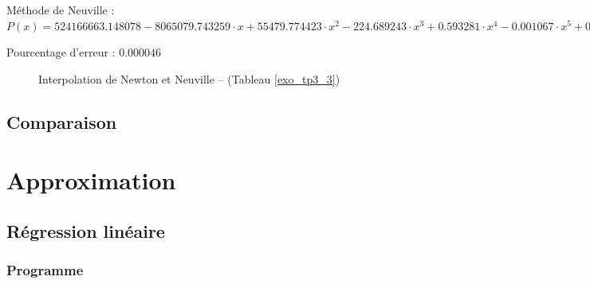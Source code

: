 \documentclass{report}
\begin{document}
      Méthode de Neuville : $P(x)= 524166663.148078-8065079.743259 \cdot x + 55479.774423 \cdot x^{2} - 224.689243 \cdot x^{3}  + 0.593281 \cdot x^{4} - 0.001067 \cdot x^{5}  + 0.000001 \cdot x^{6} - 0.000000 \cdot x^{7}  + 0.000000 \cdot x^{8} - 0.000000 \cdot x^{9}  + 0.000000 \cdot x^{10} $
      
      Pourcentage d'erreur : $0.000046$
      \begin{figure}[h]
	\centering
	\caption{Interpolation de Newton et Neuville -- (Tableau \ref{exo_tp3_3})}
      \end{figure}
      \renewcommand{\arraystretch}{2}
      \renewcommand{\arraystretch}{1}
    \newpage
    \section{Comparaison}
  \chapter{Approximation}
    \section{Régression linéaire}
      \subsection{Programme}
	
    \newpage
\end{document}
